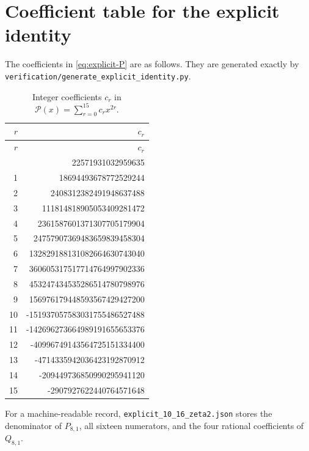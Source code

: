 \section{Coefficient table for the explicit identity}
\label{app:coefficients}

The coefficients in \eqref{eq:explicit-P} are as follows.  They are generated exactly by \nolinkurl{verification/generate_explicit_identity.py}.

\begin{longtable}{r@{\qquad}r}
\caption{Integer coefficients $c_r$ in $\mathscr P(x)=\sum_{r=0}^{15}c_rx^{2r}$.\label{tab:explicit-coefficients}}\\
\toprule
$r$&$c_r$\\
\midrule
\endfirsthead
\toprule
$r$&$c_r$\\
\midrule
\endhead
\bottomrule
\endfoot
0&22571931032959635\\
1&18694493678772529244\\
2&2408312382491948637488\\
3&111814818905053409281472\\
4&2361587601371307705179904\\
5&24757907369483659839458304\\
6&132829188131082664630743040\\
7&360605317517714764997902336\\
8&453247434535286514780798976\\
9&156976179448593567429427200\\
10&-151937057583031755486527488\\
11&-142696273664989191655653376\\
12&-40996749143564725151334400\\
13&-4714335942036423192870912\\
14&-209449736850990295941120\\
15&-2907927622440764571648\\
\end{longtable}

For a machine-readable record, \texttt{explicit\_10\_16\_zeta2.json} stores the denominator of $P_{8,1}$, all sixteen numerators, and the four rational coefficients of $Q_{8,1}$.

